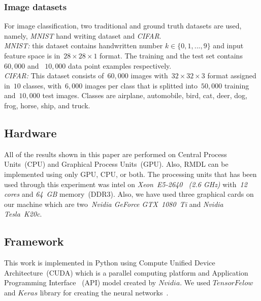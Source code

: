 \documentclass[sigconf, final]{acmart}
\begin{document}
\subsubsection{Image datasets}
For image classification, two traditional and ground truth datasets are used, namely, \textit{MNIST} hand writing dataset and \textit{CIFAR}.\\\textit{MNIST:} this dataset contains handwritten number $k\in\{0,1,...,9\}$ and input feature space is in~$28\times28\times1$ format. The training and the test set contains~$60,000$ and ~$10,000$ data point examples respectively.\\ \textit{CIFAR:} This dataset consists of~$60,000$ images with~$32\times32\times3$ format assigned in~$10$ classes, with~$6,000$ images per class that is splitted into~$50,000$ training and~$10,000$ test images. Classes are airplane, automobile, bird, cat, deer, dog, frog, horse, ship, and truck.



\subsection{Hardware}
All of the results shown in this paper are performed on Central Process Units~(CPU) and Graphical Process Units~(GPU). Also, RMDL can be implemented using only GPU, CPU, or both. The processing units that has been used through this experiment was intel on \textit{Xeon~E5-2640~ (2.6 GHz)} with~\textit{12 cores} and \textit{64~GB} memory~(DDR3). Also, we have used three graphical cards on our machine which are two~\textit{Nvidia GeForce GTX~1080~Ti} and \textit{Nvidia Tesla~K20c}.
\subsection{Framework}
This work is implemented in Python using Compute Unified Device Architecture~(CUDA) which is a parallel computing platform and Application Programming Interface ~(API) model created by $Nvidia$. We used $TensorFelow$ and $Keras$ library for creating the neural networks~\cite{abadi2016tensorflow,chollet2015keras}. 
\end{document}
